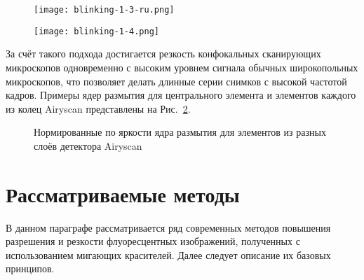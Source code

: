 \begin{figure}[ht]
	\centering
	\hfill
	\begin{minipage}{0.45\textwidth}
		\centering
		\texttt{[image: blinking-1-3-ru.png]}
		\label{fig:blinking-airyscan}
	\end{minipage} \hfill
	\begin{minipage}{0.45\textwidth}
		\centering
		\texttt{[image: blinking-1-4.png]}
		\label{fig:blinking-psf-comparison}
	\end{minipage}
	\hfill
\end{figure}

За счёт такого подхода достигается резкость конфокальных сканирующих микроскопов одновременно с высоким уровнем сигнала обычных широкопольных микроскопов, что позволяет делать длинные серии снимков с высокой частотой кадров. Примеры ядер размытия для центрального элемента и элементов каждого из колец Airyscan представлены на Рис.~\ref{fig:blinking-airyscan-psf-samples}.

\begin{figure}[ht]
	\caption{Нормированные по яркости ядра размытия для элементов из разных слоёв детектора Airyscan}
	\label{fig:blinking-airyscan-psf-samples}
\end{figure}

\section{Рассматриваемые методы}

В данном параграфе рассматривается ряд современных методов повышения разрешения и резкости флуоресцентных изображений, полученных с использованием мигающих красителей. Далее следует описание их базовых принципов.

